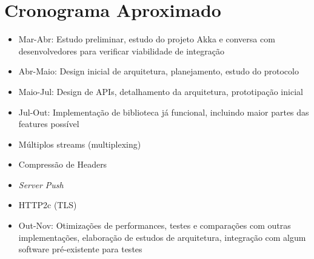 \documentclass[12pt,a4paper,openright,twoside,]{abntex2}	%
\begin{document}
\section{Cronograma Aproximado}\label{cronograma-aproximado}

\begin{itemize}
\tightlist
\item
  Mar-Abr: Estudo preliminar, estudo do projeto Akka e conversa com
  desenvolvedores para verificar viabilidade de integração
\item
  Abr-Maio: Design inicial de arquitetura, planejamento, estudo do
  protocolo
\item
  Maio-Jul: Design de APIs, detalhamento da arquitetura, prototipação
  inicial
\item
  Jul-Out: Implementação de biblioteca já funcional, incluindo maior
  partes das features possível
\item
  Múltiplos streams (multiplexing)\\
\item
  Compressão de Headers\\
\item
  \emph{Server Push}\\
\item
  HTTP2c (TLS)\\
\item
  Out-Nov: Otimizações de performances, testes e comparações com outras
  implementações, elaboração de estudos de arquitetura, integração com
  algum software pré-existente para testes
\end{itemize}

\end{document}
